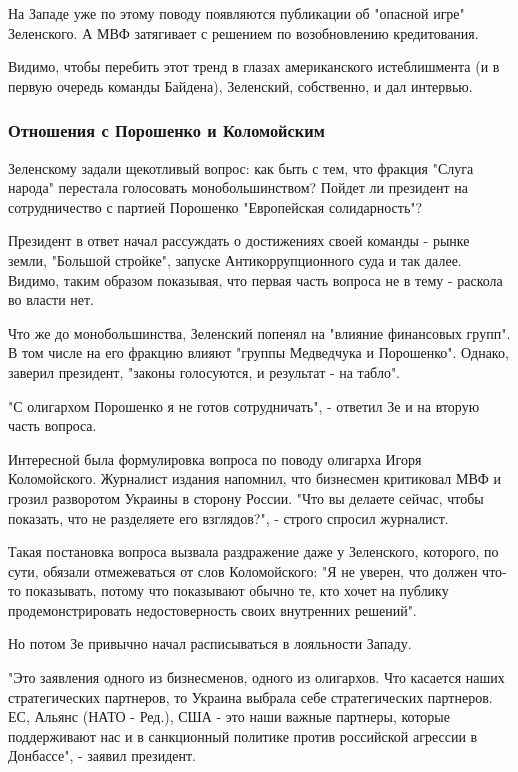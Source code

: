 {На Западе уже по этому поводу появляются публикации об "опасной игре"
Зеленского. А МВФ затягивает с решением по возобновлению кредитования.

Видимо, чтобы перебить этот тренд в глазах американского истеблишмента (и в
первую очередь команды Байдена), Зеленский, собственно, и дал интервью.

\subsubsection{Отношения с Порошенко и Коломойским}

Зеленскому задали щекотливый вопрос: как быть с тем, что фракция "Слуга народа"
перестала голосовать монобольшинством? Пойдет ли президент на сотрудничество с
партией Порошенко "Европейская солидарность"?

Президент в ответ начал рассуждать о достижениях своей команды - рынке земли,
"Большой стройке", запуске Антикоррупционного суда и так далее. Видимо, таким
образом показывая, что первая часть вопроса не в тему - раскола во власти нет.

Что же до монобольшинства, Зеленский попенял на "влияние финансовых групп". В
том числе на его фракцию влияют "группы Медведчука и Порошенко". Однако,
заверил президент, "законы голосуются, и результат - на табло". 

"С олигархом Порошенко я не готов сотрудничать", - ответил Зе и на вторую часть
вопроса. 

Интересной была формулировка вопроса по поводу олигарха Игоря Коломойского.
Журналист издания напомнил, что бизнесмен критиковал МВФ и грозил разворотом
Украины в сторону России. "Что вы делаете сейчас, чтобы показать, что не
разделяете его взглядов?", - строго спросил журналист. 

Такая постановка вопроса вызвала раздражение даже у Зеленского, которого, по
сути, обязали отмежеваться от слов Коломойского: "Я не уверен, что должен
что-то показывать, потому что показывают обычно те, кто хочет на публику
продемонстрировать недостоверность своих внутренних решений".

Но потом Зе привычно начал расписываться в лояльности Западу. 

"Это заявления одного из бизнесменов, одного из олигархов. Что касается наших
стратегических партнеров, то Украина выбрала себе стратегических партнеров. ЕС,
Альянс (НАТО - Ред.), США - это наши важные партнеры, которые поддерживают нас
и в санкционный политике против российской агрессии в Донбассе", - заявил
президент. 

}
